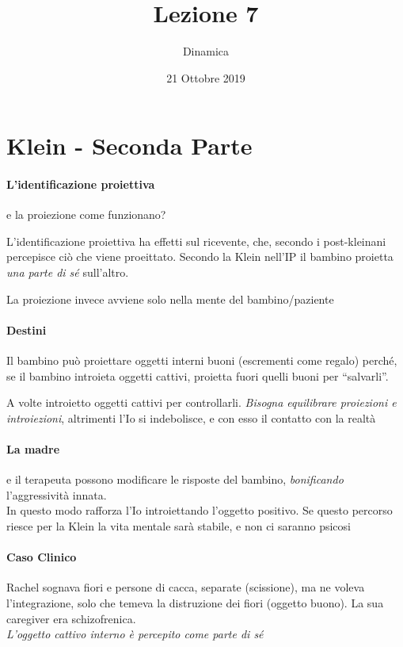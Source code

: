 \documentclass[12pt, a4paper]{article}
\date{21 Ottobre 2019}
\title{Lezione 7}
\author{Dinamica}
\begin{document}
\maketitle

\section{Klein - Seconda Parte}

\paragraph{L'identificazione proiettiva} e la proiezione come funzionano?

L'identificazione proiettiva ha effetti sul ricevente, che, secondo i post-kleinani percepisce ciò che viene proeittato. 
Secondo la Klein nell'IP il bambino proietta \emph{una parte di s\'e} sull'altro.

La proiezione invece avviene solo nella mente del bambino/paziente  

\paragraph{Destini} Il bambino può proiettare oggetti interni buoni (escrementi come regalo) perch\'e, se il bambino introieta oggetti cattivi, proietta fuori quelli buoni per ``salvarli''.

A volte introietto oggetti cattivi per controllarli.
\emph{Bisogna equilibrare proiezioni e introiezioni}, altrimenti l'Io si indebolisce, e con esso il contatto con la realt\`a

\paragraph{La madre} e il terapeuta possono modificare le risposte del bambino, \emph{bonificando} l'aggressivit\`a innata. \\
In questo modo rafforza l'Io introiettando l'oggetto positivo.
Se questo percorso riesce per la Klein la vita mentale sar\`a stabile, e non ci saranno psicosi

\paragraph{Caso Clinico} Rachel sognava fiori e persone di cacca, separate (scissione), ma ne voleva l'integrazione, solo che temeva la distruzione dei fiori (oggetto buono).
La sua caregiver era schizofrenica. \\
\emph{L'oggetto cattivo interno \`e percepito come parte di s\'e}
\end{document}
